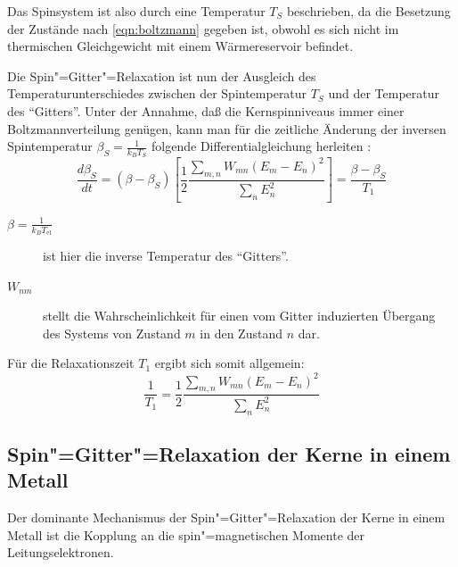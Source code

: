 Das Spinsystem ist also durch eine Temperatur $T_S$ beschrieben, da die Besetzung der Zustände nach
\eqref{eqn:boltzmann} gegeben ist, obwohl es sich nicht im thermischen
Gleichgewicht mit einem Wärmereservoir befindet.

Die Spin"=Gitter"=Relaxation ist nun der Ausgleich des Temperaturunterschiedes zwischen der
Spintemperatur $T_S$ und der Temperatur des "`Gitters"'. Unter der Annahme, daß die
Kernspinniveaus immer einer Boltzmannverteilung genügen, kann man für die zeitliche Änderung der
inversen Spintemperatur $\beta_S=\frac1{k_BT_S}$ folgende Differentialgleichung herleiten \cite[S. 148ff]{Slichter}:
	\begin{equation}
		\frac{d\beta_S}{dt}=(\beta-\beta_S)\left[\frac12\frac{\sum_{m,n}W_{mn}(E_m-E_n)^2}{\sum_nE^2_n}\right]
			= \frac{\beta-\beta_S}{T_1}
	\end{equation}
\begin{description}
	\item[$\beta=\frac1{k_BT_\mathrm{el}}$] ist hier die inverse Temperatur des "`Gitters"'.
	\item[$W_{nm}$] stellt die Wahrscheinlichkeit für einen vom Gitter induzierten Übergang des
		Systems von Zustand $m$ in den Zustand $n$ dar.
\end{description}
Für die Relaxationszeit $T_1$ ergibt sich somit allgemein:
	\begin{equation}
		\label{eqn:t1}
		\frac1{T_1}=\frac12\frac{\sum_{m,n}W_{mn}(E_m-E_n)^2}{\sum_nE^2_n}
	\end{equation}

\subsection{Spin"=Gitter"=Relaxation der Kerne in einem Metall}

Der dominante Mechanismus der Spin"=Gitter"=Relaxation der Kerne in einem Metall ist die Kopplung an
die spin"=magnetischen Momente der Leitungselektronen.

